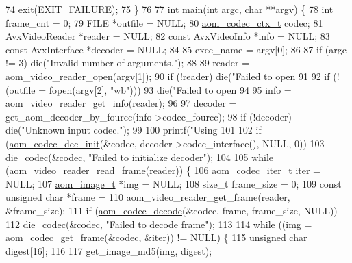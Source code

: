 \begin{DoxyCodeInclude}
{{74   exit(EXIT\_FAILURE);
75 \}
76 
77 \textcolor{keywordtype}{int} main(\textcolor{keywordtype}{int} argc, \textcolor{keywordtype}{char} **argv) \{
78   \textcolor{keywordtype}{int} frame\_cnt = 0;
79   FILE *outfile = NULL;
80   \hyperlink{structaom__codec__ctx}{aom\_codec\_ctx\_t} codec;
81   AvxVideoReader *reader = NULL;
82   \textcolor{keyword}{const} AvxVideoInfo *info = NULL;
83   \textcolor{keyword}{const} AvxInterface *decoder = NULL;
84 
85   exec\_name = argv[0];
86 
87   \textcolor{keywordflow}{if} (argc != 3) die(\textcolor{stringliteral}{"Invalid number of arguments."});
88 
89   reader = aom\_video\_reader\_open(argv[1]);
90   \textcolor{keywordflow}{if} (!reader) die(\textcolor{stringliteral}{"Failed to open %
91 
92   \textcolor{keywordflow}{if} (!(outfile = fopen(argv[2], \textcolor{stringliteral}{"wb"})))
93     die(\textcolor{stringliteral}{"Failed to open %
94 
95   info = aom\_video\_reader\_get\_info(reader);
96 
97   decoder = get\_aom\_decoder\_by\_fourcc(info->codec\_fourcc);
98   \textcolor{keywordflow}{if} (!decoder) die(\textcolor{stringliteral}{"Unknown input codec."});
99 
100   printf(\textcolor{stringliteral}{"Using %
101 
102   \textcolor{keywordflow}{if} (\hyperlink{group__decoder_gafdbfca65b19ab1f6d72b32cd01753b9b}{aom\_codec\_dec\_init}(&codec, decoder->codec\_interface(), NULL, 0))
103     die\_codec(&codec, \textcolor{stringliteral}{"Failed to initialize decoder"});
104 
105   \textcolor{keywordflow}{while} (aom\_video\_reader\_read\_frame(reader)) \{
106     \hyperlink{group__codec_gadf9e173c9e02788a9999399edab20a02}{aom\_codec\_iter\_t} iter = NULL;
107     \hyperlink{structaom__image}{aom\_image\_t} *img = NULL;
108     \textcolor{keywordtype}{size\_t} frame\_size = 0;
109     \textcolor{keyword}{const} \textcolor{keywordtype}{unsigned} \textcolor{keywordtype}{char} *frame =
110         aom\_video\_reader\_get\_frame(reader, &frame\_size);
111     \textcolor{keywordflow}{if} (\hyperlink{group__decoder_gab03fdb999d1f83a5896869a3ba5f68f7}{aom\_codec\_decode}(&codec, frame, frame\_size, NULL))
112       die\_codec(&codec, \textcolor{stringliteral}{"Failed to decode frame"});
113 
114     \textcolor{keywordflow}{while} ((img = \hyperlink{group__decoder_ga780aad27a2728abefab725faa3bc4f79}{aom\_codec\_get\_frame}(&codec, &iter)) != NULL) \{
115       \textcolor{keywordtype}{unsigned} \textcolor{keywordtype}{char} digest[16];
116 
117       get\_image\_md5(img, digest);
}}}}}
\end{DoxyCodeInclude}

